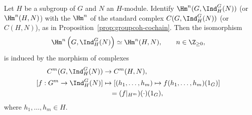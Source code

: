 \begin{proposition}\label{prop:Shapiro-std-coh}
	Let $H$ be a subgroup of $G$ and $N$ an $H$-module. Identify
	$\Hm^n(G,\Ind^G_H(N))$ (or $\Hm^n(H,N)$) with the $\Hm^n$ of the
	standard complex $C(G,\Ind^G_H(N))$ (or $C(H,N)$), as in
	Proposition~\ref{prop:groupcoh-cochain}. Then the isomorphism
	\[ \Hm^n\left(G,\Ind^G_H(N)\right)\simeq\Hm^n(H,N),
	\qquad n\in\Z_{\geq0}, \]
	is induced by the morphism of complexes
	\begin{align*}
		C^m(G,\Ind^G_H(N))&\to C^m(H,N),\\
		[f:G^m\to\Ind^G_H(N)]&\mapsto
		[(h_1,\ldots,h_m)\mapsto f(h_1,\ldots,h_m)(1_G)]\\
		&\quad=(f|_{H^m})(\cdot)(1_G),
	\end{align*}
	where $h_1,\ldots,h_m\in H$.
\end{proposition}
